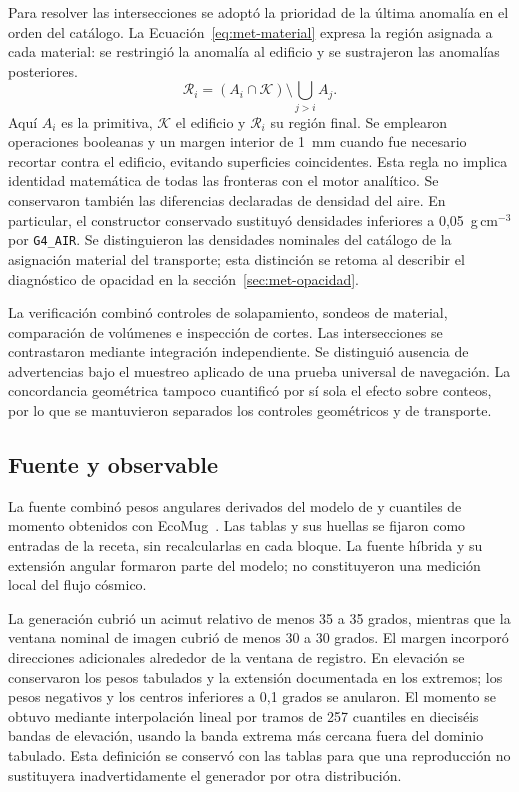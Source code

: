 Para resolver las intersecciones se adoptó la prioridad de la última anomalía en el orden del catálogo. La Ecuación~\eqref{eq:met-material} expresa la región asignada a cada material: se restringió la anomalía al edificio y se sustrajeron las anomalías posteriores.
\begin{equation}\mathcal R_i=(A_i\cap\mathcal K)\setminus\bigcup_{j>i}A_j.\label{eq:met-material}\end{equation}
Aquí $A_i$ es la primitiva, $\mathcal K$ el edificio y $\mathcal R_i$ su región final. Se emplearon operaciones booleanas y un margen interior de 1~mm cuando fue necesario recortar contra el edificio, evitando superficies coincidentes. Esta regla no implica identidad matemática de todas las fronteras con el motor analítico. Se conservaron también las diferencias declaradas de densidad del aire. En particular, el constructor conservado sustituyó densidades inferiores a 0,05~g\,cm$^{-3}$ por \texttt{G4\_AIR}. Se distinguieron las densidades nominales del catálogo de la asignación material del transporte; esta distinción se retoma al describir el diagnóstico de opacidad en la sección~\ref{sec:met-opacidad}.

La verificación combinó controles de solapamiento, sondeos de material, comparación de volúmenes e inspección de cortes. Las intersecciones se contrastaron mediante integración independiente. Se distinguió ausencia de advertencias bajo el muestreo aplicado de una prueba universal de navegación. La concordancia geométrica tampoco cuantificó por sí sola el efecto sobre conteos, por lo que se mantuvieron separados los controles geométricos y de transporte.

\subsection{Fuente y observable}\label{subsec:met-fuente}
La fuente combinó pesos angulares derivados del modelo de \textcite{guan2015muonflux} y cuantiles de momento obtenidos con EcoMug~\parencite{pagano2021}. Las tablas y sus huellas se fijaron como entradas de la receta, sin recalcularlas en cada bloque. La fuente híbrida y su extensión angular formaron parte del modelo; no constituyeron una medición local del flujo cósmico.

La generación cubrió un acimut relativo de menos 35 a 35 grados, mientras que la ventana nominal de imagen cubrió de menos 30 a 30 grados. El margen incorporó direcciones adicionales alrededor de la ventana de registro. En elevación se conservaron los pesos tabulados y la extensión documentada en los extremos; los pesos negativos y los centros inferiores a 0,1 grados se anularon. El momento se obtuvo mediante interpolación lineal por tramos de 257 cuantiles en dieciséis bandas de elevación, usando la banda extrema más cercana fuera del dominio tabulado. Esta definición se conservó con las tablas para que una reproducción no sustituyera inadvertidamente el generador por otra distribución.

